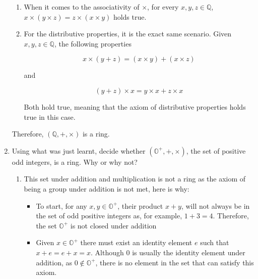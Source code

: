 \documentclass[11pt]{article}
\newcommand{\Q}{{\mathbb{Q}}}
\begin{document}
\begin{enumerate}[{\bf S1.}]
\begin{enumerate}
                \item 

                    When it comes to the associativity of $\times$, for every $x, y, z\in\Q$, $x\times(y\times z) = z\times(x\times y)$ holds true.

                \item 

                    For the distributive properties, it is the exact same scenario. Given $x, y, z\in\Q$, the following properties

                    \[
                        x \times (y + z) = (x\times y) + (x\times z)
                    \]

                    and 

                    \[
                        (y + z) \times x = y\times x + z\times x
                    \]

                    Both hold true, meaning that the axiom of distributive properties holds true in this case. 

            \end{enumerate}

            Therefore, $(\Q, +, \times)$ is a ring. 

        \item Using what was just learnt, decide whether $(\mathbb{O}^+, +, \times)$, the set of positive odd integers, 
              is a ring. Why or why not?

              \begin{enumerate}
                
                \item 

                    This set under addition and multiplication is not a ring as the axiom of being a group under addition is not met, here
                    is why:

                    \begin{itemize}
                        
                        \item To start, for any $x, y\in\mathbb{O}^+$, their product $x + y$, will not always be in the set 
                              of odd positive integers as, for example, $1 + 3 = 4$. Therefore, the set $\mathbb{O}^+$ is not closed under
                              addition

                        \item Given $x\in\mathbb{O}^+$ there must exist an identity element $e$ such that $x + e = e + x = x$. 
                              Although $0$ is usually the identity element under addition, as $0\notin\mathbb{O}^+$, there is no element in the
                              set that can satisfy this axiom.


\end{itemize}
\end{enumerate}
\end{enumerate}
\end{document}

